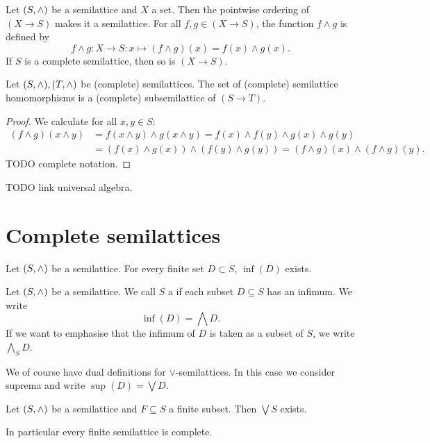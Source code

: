 \begin{proposition}
Let $\sSet{S,\wedge}$ be a semilattice and $X$ a set. Then the pointwise ordering of $(X\to S)$ makes it a semilattice. For all $f,g\in (X\to S)$, the function $f\wedge g$ is defined by
\[ f\wedge g: X\to S: x\mapsto (f\wedge g)(x) = f(x) \wedge g(x). \]
If $S$ is a complete semilattice, then so is $(X\to S)$.
\end{proposition}

\begin{proposition} \label{semilatticeOfSemilatticeHomomorphisms}
Let $\sSet{S,\wedge}, \sSet{T, \wedge}$ be (complete) semilattices. The set of (complete) semilattice homomorphisms is a (complete) subsemilattice of $(S\to T)$.
\end{proposition}
\begin{proof}
We calculate for all $x,y\in S$:
\begin{align*}
(f\wedge g)(x\wedge y) &= f(x\wedge y)\wedge g(x\wedge y) = f(x)\wedge f(y) \wedge g(x) \wedge g(y) \\
&= (f(x)\wedge g(x))\wedge(f(y)\wedge g(y)) = (f\wedge g)(x) \wedge (f\wedge g)(y).
\end{align*}
TODO complete notation.
\end{proof}
TODO link universal algebra.

\section{Complete semilattices}
\begin{lemma}
Let $\sSet{S,\wedge}$ be a semilattice. For every finite set $D\subset S$, $\inf(D)$ exists.
\end{lemma}
\begin{definition}
Let $\sSet{S,\wedge}$ be a semilattice. We call $S$ a  if each subset $D\subseteq S$ has an infimum. We write
\[ \inf(D) = \bigwedge D. \]
If we want to emphasise that the infimum of $D$ is taken as a subset of $S$, we write $\bigwedge_S D$.
\end{definition}

We of course have dual definitions for $\vee$-semilattices. In this case we consider suprema and write $\sup(D) = \bigvee D$.

\begin{lemma} \label{supInfFiniteSubsetsLattice}
Let $\sSet{S,\wedge}$ be a semilattice and $F\subseteq S$ a finite subset. Then $\bigvee S$ exists. 
\end{lemma}
In particular every finite semilattice is complete.


